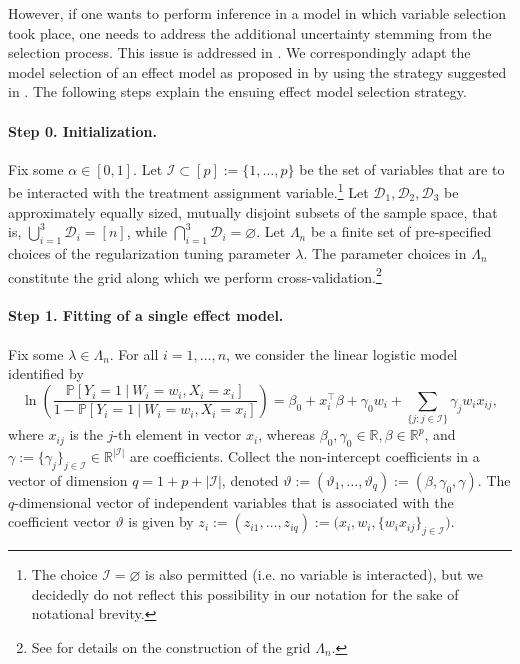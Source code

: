 \documentclass[11pt]{article}
\renewcommand{\P}{\mathbb{P}}
\newcommand{\R}{\mathbb{R}}
\newcommand{\D}{\mathcal{D}}
\begin{document}
However, if one wants to perform inference in a model in which variable selection took place, one needs to address the additional uncertainty stemming from the selection process. This issue is addressed in \cite{wasserman2009high}. We correspondingly adapt the model selection of an effect model as proposed in \cite{kent2020path} by using the strategy suggested in \cite{wasserman2009high}. The following steps explain the ensuing effect model selection strategy.

\paragraph{Step 0. Initialization.} Fix some $\alpha \in [0,1]$. Let $\mathcal{I}\subset [p] := \{1,\dots,p\}$ be the set of variables that are to be interacted with the treatment assignment variable.\footnote{The choice $\mathcal{I}=\varnothing$ is also permitted (i.e. no variable is interacted), but we decidedly do not reflect this possibility in our notation for the sake of notational brevity.} Let $\D_1,\D_2,\D_3$ be approximately equally sized, mutually disjoint subsets of the sample space, that is, $\bigcup_{i=1}^3 \D_i = [n]$, while $\bigcap_{i=1}^3 \D_i = \varnothing$. Let $\Lambda_n$ be a finite set of pre-specified choices of the regularization tuning parameter $\lambda$. The parameter choices in $\Lambda_n$ constitute the grid along which we perform cross-validation.\footnote{See \cite{friedman2010} for details on the construction of the grid $\Lambda_n$.} 

\paragraph{Step 1. Fitting of a single effect model.} Fix some $\lambda \in \Lambda_n$. For all $i = 1,\dots, n$, we consider the linear logistic model identified by
\begin{equation} \label{eq:effect-model-individual}
    \ln \left( \frac{ \P[Y_i = 1 \ |\ W_i = w_i, X_i = x_i] }{1 - \P[Y_i = 1 \ |\ W_i = w_i, X_i = x_i]} \right)
    =
    \beta_0 + x_i^\top \beta + \gamma_0w_i + \sum_{\{j:j\in\mathcal{I}\}} \gamma_j w_i x_{ij},
\end{equation}
where $x_{ij}$ is the $j$-th element in vector $x_i$, whereas $\beta_0, \gamma_0\in\R, \beta\in\R^p$, and $\gamma := \{ \gamma_j \}_{j\in\mathcal{I}} \in \R^{|\mathcal{I}|}$ are coefficients. Collect the non-intercept coefficients in a vector of dimension $q = 1 + p + |\mathcal{I}|$, denoted $\vartheta := (\vartheta_1,\dots,\vartheta_q) := (\beta, \gamma_0, \gamma)$. The $q$-dimensional vector of independent variables that is associated with the coefficient vector $\vartheta$ is given by $z_i := (z_{i1},\dots,z_{iq}) := \big(x_i, w_i, \{ w_i x_{ij} \}_{j\in\mathcal{I}}\big)$.
\end{document}
